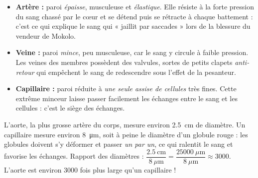 \documentclass[11pt]{article}
\newcommand{\cle}[1]{{\popxbold\color{popdark}#1}}
\begin{document}
\begin{itemize}
\item \textbf{Artère :} paroi \emph{épaisse}, musculeuse et \emph{élastique}. Elle résiste à la forte pression du sang chassé par le cœur et se détend puis se rétracte à chaque battement : c'est ce qui explique le sang qui « jaillit par saccades » lors de la blessure du vendeur de Mokolo.
\item \textbf{Veine :} paroi \emph{mince}, peu musculeuse, car le sang y circule à faible pression. Les veines des membres possèdent des \cle{valvules}, sortes de petits clapets \emph{anti-retour} qui empêchent le sang de redescendre sous l'effet de la pesanteur.
\item \textbf{Capillaire :} paroi réduite à \emph{une seule assise de cellules} très fines. Cette extrême minceur laisse passer facilement les échanges entre le sang et les cellules : c'est le siège des échanges.
\end{itemize}

\begin{exemplebox}
L'aorte, la plus grosse artère du corps, mesure environ \SI{2,5}{cm} de diamètre. Un capillaire mesure environ \SI{8}{\micro\metre}, soit à peine le diamètre d'un globule rouge : les globules doivent s'y déformer et passer \emph{un par un}, ce qui ralentit le sang et favorise les échanges. Rapport des diamètres : $\dfrac{\num{2,5}\ \text{cm}}{\num{8}\ \mu\text{m}} = \dfrac{\num{25000}\ \mu\text{m}}{\num{8}\ \mu\text{m}} \approx \num{3000}$. L'aorte est environ \num{3000} fois plus large qu'un capillaire !
\end{exemplebox}
\end{document}
